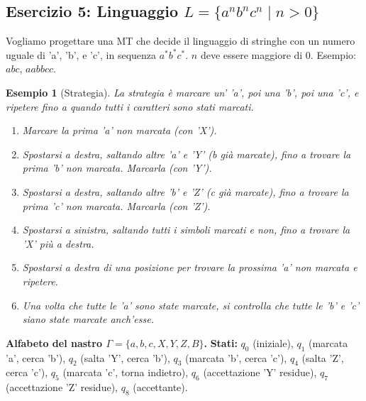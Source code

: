 \documentclass[a4paper, 11pt]{book} %
\newtheorem{example}[theorem]{Esempio}
\theoremstyle{definition}
\begin{document}
\subsection{Esercizio 5: Linguaggio $L = \{a^n b^n c^n \mid n > 0\}$}

Vogliamo progettare una MT che decide il linguaggio di stringhe con un numero uguale di 'a', 'b', e 'c', in sequenza $a^*b^*c^*$. $n$ deve essere maggiore di $0$. Esempio: $abc$, $aabbcc$.

\begin{example}[Strategia]
La strategia è marcare un' 'a', poi una 'b', poi una 'c', e ripetere fino a quando tutti i caratteri sono stati marcati.
\begin{enumerate}
    \item Marcare la prima 'a' non marcata (con 'X').
    \item Spostarsi a destra, saltando altre 'a' e 'Y' (b già marcate), fino a trovare la prima 'b' non marcata. Marcarla (con 'Y').
    \item Spostarsi a destra, saltando altre 'b' e 'Z' (c già marcate), fino a trovare la prima 'c' non marcata. Marcarla (con 'Z').
    \item Spostarsi a sinistra, saltando tutti i simboli marcati e non, fino a trovare la 'X' più a destra.
    \item Spostarsi a destra di una posizione per trovare la prossima 'a' non marcata e ripetere.
    \item Una volta che tutte le 'a' sono state marcate, si controlla che tutte le 'b' e 'c' siano state marcate anch'esse.
\end{enumerate}
\end{example}

\noindent \textbf{Alfabeto del nastro $\Gamma = \{a, b, c, X, Y, Z, B\}$.}
\noindent \textbf{Stati:} $q_0$ (iniziale), $q_1$ (marcata 'a', cerca 'b'), $q_2$ (salta 'Y', cerca 'b'), $q_3$ (marcata 'b', cerca 'c'), $q_4$ (salta 'Z', cerca 'c'), $q_5$ (marcata 'c', torna indietro), $q_6$ (accettazione 'Y' residue), $q_7$ (accettazione 'Z' residue), $q_8$ (accettante).
\end{document}
